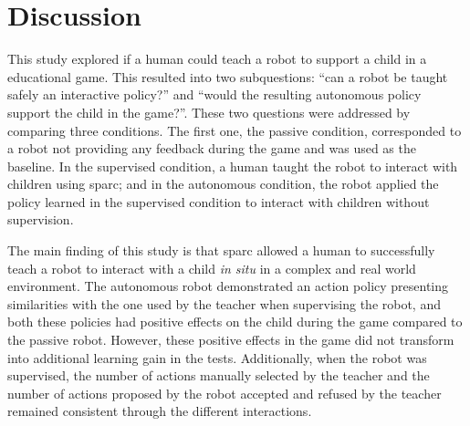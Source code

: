 %
%


\section{Discussion} \label{sec:tutoring_discussion}

This study explored if a human could teach a robot to support a child in a educational game. This resulted into two subquestions: ``can a robot be taught safely an interactive policy?'' and ``would the resulting autonomous policy support the child in the game?''. These two questions were addressed by comparing three conditions. The first one, the passive condition, corresponded to a robot not providing any feedback during the game and was used as the baseline. In the supervised condition, a human taught the robot to interact with children using \gls{sparc}; and in the autonomous condition, the robot applied the policy learned in the supervised condition to interact with children without supervision.

The main finding of this study is that \gls{sparc} allowed a human to successfully teach a robot to interact with a child \textit{in situ} in a complex and real world environment. The autonomous robot demonstrated an action policy presenting similarities with the one used by the teacher when supervising the robot, and both these policies had positive effects on the child during the game compared to the passive robot. However, these positive effects in the game did not transform into additional learning gain in the tests. Additionally, when the robot was supervised, the number of actions manually selected by the teacher and the number of actions proposed by the robot accepted and refused by the teacher remained consistent through the different interactions.


